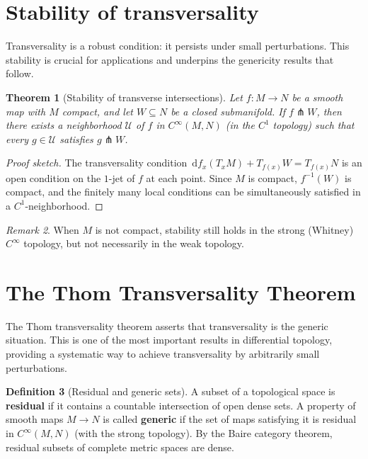 \documentclass[12pt,a4paper,openany]{book}
\newtheorem{theorem}{Theorem}[section]
\theoremstyle{definition}
\newtheorem{definition}[theorem]{Definition}
\theoremstyle{remark}
\newtheorem{remark}[theorem]{Remark}
\newcommand{\dd}{\,\mathrm{d}}
\begin{document}
\section{Stability of transversality}\label{sec:stability-transversality}

Transversality is a robust condition: it persists under small perturbations.
This stability is crucial for applications and underpins the genericity results
that follow.

\begin{theorem}[Stability of transverse intersections]\label{thm:stability-transversality}
Let $f \colon M \to N$ be a smooth map with $M$ compact, and let
$W \subseteq N$ be a closed submanifold. If $f \pitchfork W$, then there
exists a neighborhood $\mathcal{U}$ of $f$ in $C^\infty(M, N)$
(in the $C^1$ topology) such that every $g \in \mathcal{U}$ satisfies
$g \pitchfork W$.
\end{theorem}

\begin{proof}[Proof sketch]
The transversality condition $\dd f_x(T_x M) + T_{f(x)}W = T_{f(x)}N$ is
an open condition on the $1$-jet of $f$ at each point. Since $M$ is compact,
$f^{-1}(W)$ is compact, and the finitely many local conditions can be
simultaneously satisfied in a $C^1$-neighborhood.
\end{proof}

\begin{remark}\label{rem:stability-noncompact}
When $M$ is not compact, stability still holds in the strong (Whitney)
$C^\infty$ topology, but not necessarily in the weak topology.
\end{remark}

\section{The Thom Transversality Theorem}\label{sec:thom-transversality}

The Thom transversality theorem asserts that transversality is the generic
situation. This is one of the most important results in differential
topology, providing a systematic way to achieve transversality by
arbitrarily small perturbations.

\begin{definition}[Residual and generic sets]\label{def:residual-generic}
A subset of a topological space is \textbf{residual} if it contains a
countable intersection of open dense sets. A property of smooth maps
$M \to N$ is called \textbf{generic} if the set of maps satisfying it
is residual in $C^\infty(M, N)$ (with the strong topology). By the
Baire category theorem, residual subsets of complete metric spaces are
dense.
\end{definition}
\end{document}
